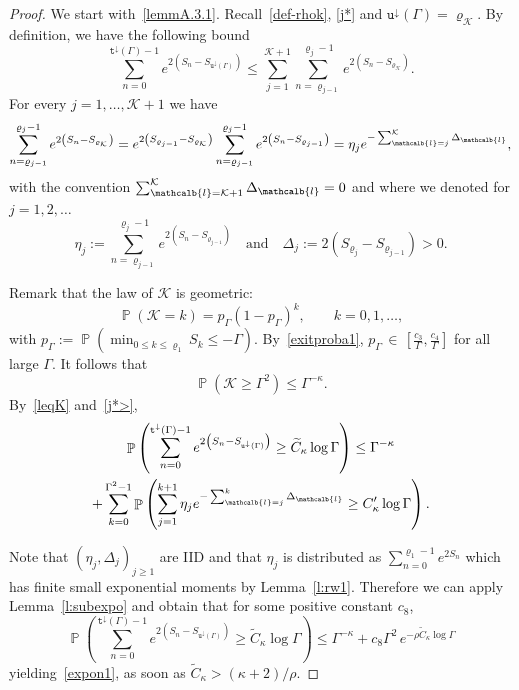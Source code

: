 \documentclass[AHL,Unicode,longabstracts,published]{cedram}
\newcommand{\gk}{\kappa}
\renewcommand*\ss{\mathtt{u}}
\newcommand{\ttt}{\mathtt{t}}
\newcommand*\td{{\ttt}^\downarrow}
\newcommand{\tudown}{\ss^\downarrow}
\DeclareMathOperator{\p}{\mathbb{P}}
\renewcommand{\ell}{\mathcalb{l}}
\newcommand{\clK}{\mathcal{K}}
\begin{document}
\begin{proof}
We start with~\eqref{lemmA.3.1}. Recall~\eqref{def-rhok}, \eqref{j*} and $\tudown(\Gamma)=\varrho_{\clK}$. By definition, we have the following bound
\begin{equation}\label{leqK}
\sum_{n=0}^{\td(\Gamma)-1} e^{2 \left(S_n- S_{\tudown(\Gamma)}\right)}\le
\sum_{j=1}^{{\clK}+1}
\sum_{n=\varrho_{j-1}}^{\varrho_{j}-1} e^{ 2 \left(S_n- S_{\varrho_{\clK}}\right)}.
\end{equation}
For every {{ $j= 1, \dots, \clK+1$}} we have
\begin{equation}
\sum_{n=\varrho_{j-1}}^{\varrho_{j}-1} e^{ 2 \left(S_n- S_{\varrho_{\clK}}\right)} =e^{2 \left(S_{\varrho_{j-1}}- S_{\varrho_{\clK}}\right)} \sum_{n=\varrho_{j-1}}^{\varrho_{j}-1} e^{ 2 \left(S_n- S_{\varrho_{j-1}}\right)} = \eta_{j} e^{- \sum_{\ell=j}^{\clK} \Delta_\ell},
\end{equation}
with the convention $\sum_{\ell= {\clK}+1}^{\clK} \Delta_\ell=0$ and where we denoted for $j=1,2, \dots$
\begin{equation}
\eta_j:= \sum_{n=\varrho_{j-1}}^{\varrho_{j}-1} e^{ 2\left(S_n- S_{\varrho_{j-1}}\right)}\quad\text{and}\quad
\Delta_j:= 2(S_{\varrho_j}- S_{\varrho_{j-1}})>0.
\end{equation}

Remark that the law of ${\clK}$ is geometric:
\begin{equation}
\p({\clK}=k)= p_\Gamma (1-p_\Gamma)^{k}, \qquad k= 0,1, \dots,
\end{equation}
with $p_\Gamma:=\p\left(\min_{0\le k\le \varrho_1} S_k \le -\Gamma \right) $. By~\eqref{exitproba1}, $p_\Gamma\,\in\, [\frac{c_3}\Gamma, \frac{c_4}\Gamma] $ for all large $\Gamma$. It follows that
\begin{equation}
\p\left({\clK} \ge \Gamma^2\right) \le \Gamma^{-\kappa}.\label{j*>}
\end{equation}
By~\eqref{leqK} and~\eqref{j*>},
\begin{multline}\label{I_1}
\p\left(\sum_{n=0}^{\td(\Gamma)-1} e^{2 \left(S_n- S_{\tudown(\Gamma)}\right)} \ge \widetilde{C}_\kappa \log \Gamma\right) \le
\Gamma^{-\kappa}\\ + \sum_{k=0}^{\Gamma^2-1} \p\left(\sum_{j=1}^{k+1} \eta_j e^{- \sum_{\ell=j}^k \Delta_\ell} \ge C_\gk' \log \Gamma\right).
\end{multline}


Note that $(\eta_j, \Delta_j)_{j\ge 1}$ are IID and that $\eta_j$ is distributed as $\sum_{n=0}^{\varrho_1-1} e^{2 S_n}$ which has finite small exponential moments by Lemma~\ref{l:rw1}. Therefore we can apply Lemma~\ref{l:subexpo} and obtain that for some positive constant $c_8$,
\begin{equation}
\p\left(\sum_{n=0}^{\td(\Gamma)-1} e^{2 \left(S_n- S_{\tudown(\Gamma)}\right)} \ge \widetilde{C}_\kappa \log \Gamma\right)
\le
\Gamma^{-\kappa} + c_8 \Gamma^2\, e^{-\rho  \widetilde{C}_\kappa \log \Gamma}
\end{equation}
yielding~\eqref{expon1}, as soon as $\widetilde{C}_\kappa>(\gk+2)/\rho$.


\end{proof}
\end{document}
